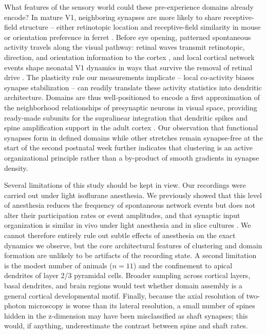 \documentclass[11pt]{article}
\begin{document}
What features of the sensory world could these pre-experience domains already encode? In mature V1, neighboring synapses are more likely to share receptive-field structure -- either retinotopic location and receptive-field similarity in mouse \citep{iacaruso2017synaptic} or orientation preference in ferret \citep{wilson2016orientation}. Before eye opening, patterned spontaneous activity travels along the visual pathway: retinal waves transmit retinotopic, direction, and orientation information to the cortex \citep{ackman2012retinal}, and local cortical network events shape neonatal V1 dynamics in ways that survive the removal of retinal drive \citep{siegel2012peripheral}. The plasticity rule our measurements implicate -- local co-activity biases synapse stabilization -- can readily translate these activity statistics into dendritic architecture. Domains are thus well-positioned to encode a first approximation of the neighborhood relationships of presynaptic neurons in visual space, providing ready-made subunits for the supralinear integration that dendritic spikes and spine amplification support in the adult cortex \citep{losonczy2006integrative,harnett2012synaptic,smith2013dendritic,lavzin2012nonlinear,poirazi2003pyramidal,larkum2013cellular}. Our observation that functional synapses form in defined domains while other stretches remain synapse-free at the start of the second postnatal week further indicates that clustering is an active organizational principle rather than a by-product of smooth gradients in synapse density.

Several limitations of this study should be kept in view. Our recordings were carried out under light isoflurane anesthesia. We previously showed that this level of anesthesia reduces the frequency of spontaneous network events but does not alter their participation rates or event amplitudes, and that synaptic input organization is similar in vivo under light anesthesia and in slice cultures \citep{siegel2012peripheral}. We cannot therefore entirely rule out subtle effects of anesthesia on the exact dynamics we observe, but the core architectural features of clustering and domain formation are unlikely to be artifacts of the recording state. A second limitation is the modest number of animals ($n = 11$) and the confinement to apical dendrites of layer 2/3 pyramidal cells. Broader sampling across cortical layers, basal dendrites, and brain regions would test whether domain assembly is a general cortical developmental motif. Finally, because the axial resolution of two-photon microscopy is worse than its lateral resolution, a small number of spines hidden in the z-dimension may have been misclassified as shaft synapses; this would, if anything, underestimate the contrast between spine and shaft rates.
\end{document}
